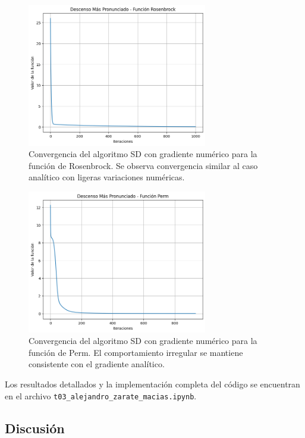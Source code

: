 \documentclass{article}
\begin{document}
\begin{figure}[H]
\centering
\includegraphics[width=0.7\textwidth]{images/7_rosenbrock.png}
\caption{Convergencia del algoritmo SD con gradiente numérico para la función de Rosenbrock. Se observa convergencia similar al caso analítico con ligeras variaciones numéricas.}
\label{fig:sd_numerical_rosenbrock}
\end{figure}

\begin{figure}[H]
\centering
\includegraphics[width=0.7\textwidth]{images/7_perm.png}
\caption{Convergencia del algoritmo SD con gradiente numérico para la función de Perm. El comportamiento irregular se mantiene consistente con el gradiente analítico.}
\label{fig:sd_numerical_perm}
\end{figure}

Los resultados detallados y la implementación completa del código se encuentran en el archivo \texttt{t03\_alejandro\_zarate\_macias.ipynb}.

\subsection{Discusión}
\end{document}
